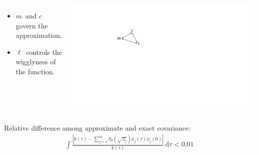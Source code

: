 \documentclass[8pt]{beamer} %
\begin{document}
\begin{frame}
\begin{columns}
\begin{itemize}
\scriptsize
\item[] $m$\, and $c$\, govern the approximation.\\
\item[] $\ell$\, controls the wigglyness of the function.
\end{itemize}

\begin{columns}
\column{5mm}
 \includegraphics[scale=0.25, trim = 80mm 110mm 210mm 40mm, clip]{performance_fig4.pdf}
\column{40mm}
\column{5mm}
\end{columns}
\end{columns}

\centering
\begin{tcolorbox}[colframe=blue!20, colback=white, title={\scriptsize Criteria of an accurate approximation as a function of $m$}, colbacktitle=lightblue, coltitle=black, boxrule=0.5pt, width=0.8\textwidth]
\scriptsize
{\small Relative difference among approximate and exact covariance:}
%
\begin{align*}
 \int \frac{ | k(\tau) - \sum_{j=1}^m S_{\theta}(\sqrt{\lambda_j}) \phi_j(\tau) \phi_j(0)|}{k(\tau)} \,\mathrm{d}\tau < 0.01
\end{align*}
\end{tcolorbox}
\end{frame}
\end{document}
